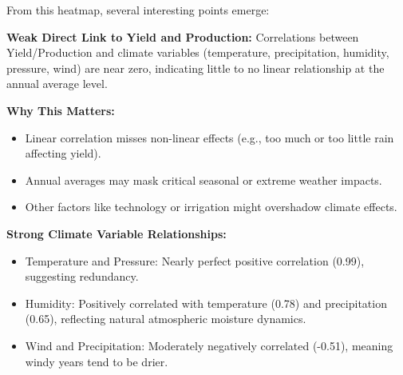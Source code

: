 From this heatmap, several interesting points emerge:

\textbf{Weak Direct Link to Yield and Production:}  
  Correlations between Yield/Production and climate variables (temperature, precipitation, humidity, pressure, wind) are near zero, indicating little to no linear relationship at the annual average level.
  
 \textbf{Why This Matters:}  
 \begin{itemize}
  \item Linear correlation misses non-linear effects (e.g., too much or too little rain affecting yield).  
  \item Annual averages may mask critical seasonal or extreme weather impacts.  
  \item Other factors like technology or irrigation might overshadow climate effects.
 \end{itemize}

 \textbf{Strong Climate Variable Relationships:}  
 \begin{itemize}
  \item Temperature and Pressure: Nearly perfect positive correlation (0.99), suggesting redundancy.  
  \item Humidity: Positively correlated with temperature (0.78) and precipitation (0.65), reflecting natural atmospheric moisture dynamics.  
  \item Wind and Precipitation: Moderately negatively correlated (-0.51), meaning windy years tend to be drier.
 \end{itemize}


